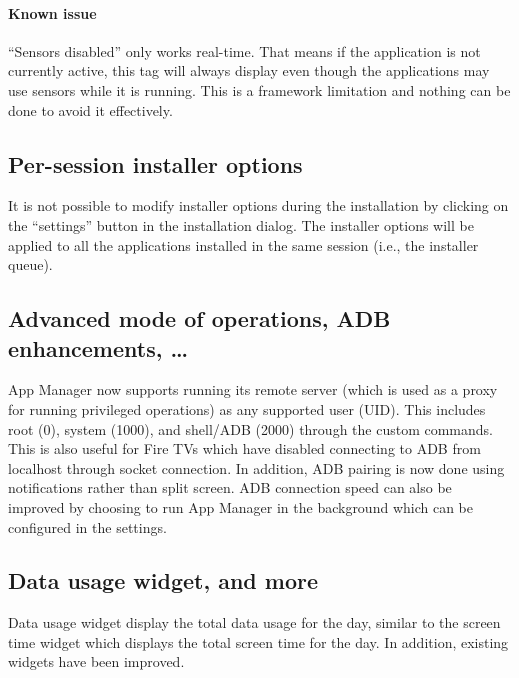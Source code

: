 \paragraph{Known issue} ``Sensors disabled'' only works real-time. That means if the application is
not currently active, this tag will always display even though the applications may use sensors
while it is running. This is a framework limitation and nothing can be done to avoid it effectively.

\subsection{Per-session installer options}
It is not possible to modify installer options during the installation by clicking on the ``settings''
button in the installation dialog. The installer options will be applied to all the applications
installed in the same session (i.e., the installer queue).

\subsection{Advanced mode of operations, ADB enhancements, \dots}
App Manager now supports running its remote server (which is used as a proxy for running privileged
operations) as any supported user (UID). This includes root (0), system (1000), and shell/ADB (2000)
through the custom commands. This is also useful for Fire TVs which have disabled connecting to ADB
from localhost through socket connection. In addition, ADB pairing is now done using notifications
rather than split screen. ADB connection speed can also be improved by choosing to run App Manager
in the background which can be configured in the settings.

\subsection{Data usage widget, and more}
Data usage widget display the total data usage for the day, similar to the screen time widget which
displays the total screen time for the day. In addition, existing widgets have been improved.


